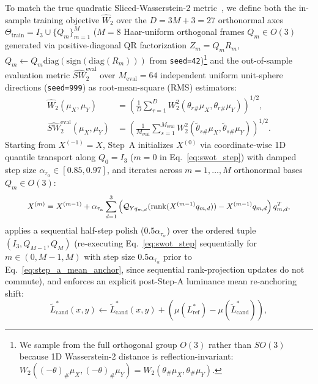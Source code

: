 \documentclass[conference,10pt]{IEEEtran}
\begin{document}
To match the true quadratic Sliced-Wasserstein-2 metric~\cite{rabin2011,bonneel2015}, we define both the in-sample training objective $\widehat{W}_2$ over the $D = 3M+3 = 27$ orthonormal axes $\Theta_{\text{train}} = I_3 \cup \{Q_m\}_{m=1}^M$ ($M=8$ Haar-uniform orthogonal frames $Q_m \in O(3)$ generated via positive-diagonal QR factorization $Z_m = Q_m R_m$, $Q_m \leftarrow Q_m \mathrm{diag}(\mathrm{sign}(\mathrm{diag}(R_m)))$ from \texttt{seed=42})\footnote{We sample from the full orthogonal group $O(3)$ rather than $SO(3)$ because 1D Wasserstein-2 distance is reflection-invariant: $W_2((-\theta)_\#\mu_X, (-\theta)_\#\mu_Y) = W_2(\theta_\#\mu_X, \theta_\#\mu_Y)$.} and the out-of-sample evaluation metric $\widehat{SW}_2^{\text{eval}}$ over $M_{\text{eval}} = 64$ independent uniform unit-sphere directions (\texttt{seed=999}) as root-mean-square (RMS) estimators:
\begin{equation}
\label{eq:sw2_rms}
\begin{aligned}
\widehat{W}_2(\mu_X, \mu_Y) &= \left(\frac{1}{D} \sum_{r=1}^D W_2^2(\theta_{r\#}\mu_X, \theta_{r\#}\mu_Y)\right)^{1/2}, \\
\widehat{SW}_2^{\text{eval}}(\mu_X, \mu_Y) &= \left(\frac{1}{M_{\text{eval}}} \sum_{s=1}^{M_{\text{eval}}} W_2^2(\tilde{\theta}_{s\#}\mu_X, \tilde{\theta}_{s\#}\mu_Y)\right)^{1/2}.
\end{aligned}
\end{equation}
Starting from $X^{(-1)} = X$, Step~A initializes $X^{(0)}$ via coordinate-wise 1D quantile transport along $Q_0 = I_3$ ($m=0$ in Eq.~\ref{eq:swot_step}) with damped step size $\alpha_{\tau_\alpha} \in [0.85, 0.97]$, and iterates across $m = 1, \dots, M$ orthonormal bases $Q_m \in O(3)$:
\begin{equation}
\label{eq:swot_step}
\resizebox{0.89\columnwidth}{!}{$\displaystyle
X^{(m)} = X^{(m-1)} + \alpha_{\tau_\alpha} \sum_{d=1}^3 \left(\mathcal{Q}_{Y q_{m,d}}(\mathrm{rank}(X^{(m-1)} q_{m,d})) - X^{(m-1)} q_{m,d}\right) q_{m,d}^T,
$}
\end{equation}
applies a sequential half-step polish ($0.5\alpha_{\tau_\alpha}$) over the ordered tuple $(I_3, Q_{M-1}, Q_M)$ (re-executing Eq.~\ref{eq:swot_step} sequentially for $m \in (0, M-1, M)$ with step size $0.5\alpha_{\tau_\alpha}$ prior to Eq.~\ref{eq:step_a_mean_anchor}, since sequential rank-projection updates do not commute), and enforces an explicit post-Step-A luminance mean re-anchoring shift:
\begin{equation}
\label{eq:step_a_mean_anchor}
\widetilde{L}^*_{\text{cand}}(x,y) \leftarrow \widetilde{L}^*_{\text{cand}}(x,y) + \left(\mu(L^*_{\text{ref}}) - \mu(\widetilde{L}^*_{\text{cand}})\right),
\end{equation}
\end{document}
